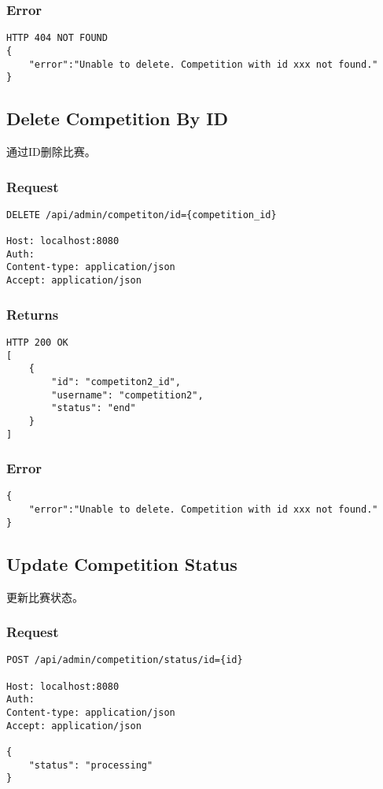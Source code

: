 \documentclass{article}
\begin{document}
\subsubsection*{Error}
\begin{lstlisting}
HTTP 404 NOT FOUND
{
    "error":"Unable to delete. Competition with id xxx not found."
}
\end{lstlisting}


\subsection{Delete Competition By ID}

通过ID删除比赛。

\subsubsection*{Request}
\begin{lstlisting}
DELETE /api/admin/competiton/id={competition_id}

Host: localhost:8080
Auth:
Content-type: application/json
Accept: application/json
\end{lstlisting}

\subsubsection*{Returns}
\begin{lstlisting}
HTTP 200 OK
[
	{
	    "id": "competiton2_id",
	    "username": "competition2",
	    "status": "end"
	}
]
\end{lstlisting}

\subsubsection*{Error}
\begin{lstlisting}
{
    "error":"Unable to delete. Competition with id xxx not found."
}
\end{lstlisting}

\subsection{Update Competition Status}

更新比赛状态。

\subsubsection*{Request}
\begin{lstlisting}
POST /api/admin/competition/status/id={id}

Host: localhost:8080
Auth:
Content-type: application/json
Accept: application/json

{
	"status": "processing"
}
\end{lstlisting}
\end{document}
